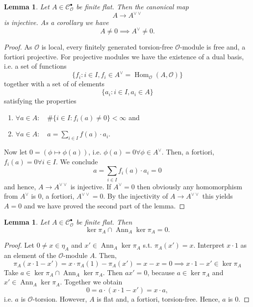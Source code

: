 \documentclass{article}
\theoremstyle{plain}%
\newtheorem{lemma}[theorem]{Lemma}
\theoremstyle{definition}
\theoremstyle{remark}
\newcommand{\cob}{\mathcal{C}_\mathcal{O}^\bullet}
\newcommand{\ann}{\operatorname{Ann}}
\renewcommand{\hom}{\operatorname{Hom}}
\begin{document}
\begin{lemma}\label{lem:pontryagininjectivity}
    Let \(A \in \cob\) be finite flat. Then the canonical map
    \[
        A \to A^{\vee\vee}
    \]
    is injective. As a corollary we have
    \[
        A \neq 0 \implies A^\vee \neq 0.  
    \]
\end{lemma}
\begin{proof}
    As \(\mathcal{O}\) is local, every finitely generated torsion-free \(\mathcal{O}\)-module is free and, 
    a fortiori projective. For projective modules we have the existence of a dual basis, i.e. a set of functions
    \[
        \{f_i \colon i \in I, f_i \in A^\vee = \hom_\mathcal{O}(A, \mathcal{O})\}  
    \]
    together with a set of of elements
    \[
        \{a_i \colon i \in I, a_i \in A\}  
    \]
    satisfying the properties
    \begin{enumerate}
        \item \(\forall a \in A\colon \quad \# \{i\in I\colon f_i(a) \neq 0\} < \infty\) and
        \item \(\forall a \in A\colon \quad a = \sum_{i \in I} f(a)\cdot a_i\).
    \end{enumerate}
    Now let \(0 = (\phi \mapsto \phi(a))\), i.e. \(\phi(a) = 0 \forall \phi \in A^\vee\).
    Then, a fortiori, \(f_i(a) = 0 \forall i \in I\).
    We conclude
    \[
        a = \sum_{i \in I} f_i(a)\cdot a_i = 0
    \]
    and hence, \(A \to A^{\vee\vee}\) is injective. If \(A^\vee = 0\) then obviously any homomorphism from \(A^\vee\)
    is \(0\), a fortiori, \(A^{\vee\vee} = 0\). By the injectivity of \(A \to A^{\vee\vee}\) this yields \(A = 0\)
    and we have proved the second part of the lemma.    
\end{proof}

\begin{lemma}\label{lem:intersectionzero}
    Let \(A \in \cob\) be finite flat. Then
    \[
        \ker \pi_A \cap \ann_A \ker \pi_A = 0.  
    \]
\end{lemma}
\begin{proof}
    Let \(0 \neq x \in \eta_A\) and \(x' \in \ann_A \ker \pi_A\) s.t. \(\pi_A(x') = x\).
    Interpret \(x \cdot 1\) as an element of the \(\mathcal{O}\)-module \(A\). Then,
    \[
        \pi_A(x \cdot 1 - x') = x\cdot \pi_A(1) - \pi_A(x') = x - x = 0 \implies x \cdot 1 - x' \in \ker \pi_A
    \]
    Take \(a \in \ker \pi_A \cap \ann_A \ker \pi_A\). Then \(ax' = 0\), because \(a\in \ker \pi_A\) 
    and \(x' \in \ann_A \ker \pi_A\). Together we obtain
    \[
        0 = a \cdot (x\cdot 1 - x') = x \cdot a,
    \]
    i.e. \(a\) is \(\mathcal{O}\)-torsion. However, \(A\) is flat and, a fortiori, torsion-free. Hence,
    \(a\) is 0.
\end{proof}
\end{document}
